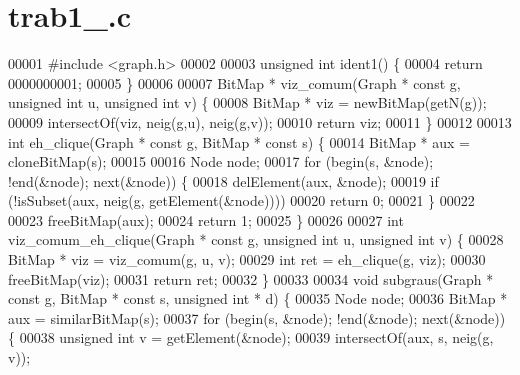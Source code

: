 \section{trab1\+\_.\+c}
\label{trab1__0000000001_8c_source}

\begin{DoxyCode}
00001 \textcolor{preprocessor}{#include <graph.h>}
00002 
00003 \textcolor{keywordtype}{unsigned} \textcolor{keywordtype}{int} ident1() \{
00004         \textcolor{keywordflow}{return} 0000000001;
00005 \}
00006 
00007 BitMap * viz_comum(Graph * \textcolor{keyword}{const} g, \textcolor{keywordtype}{unsigned} \textcolor{keywordtype}{int} u, \textcolor{keywordtype}{unsigned} \textcolor{keywordtype}{int} v) \{
00008         BitMap * viz = newBitMap(getN(g));
00009         intersectOf(viz, neig(g,u), neig(g,v));
00010         \textcolor{keywordflow}{return} viz;
00011 \}
00012 
00013 \textcolor{keywordtype}{int} eh_clique(Graph * \textcolor{keyword}{const} g, BitMap * \textcolor{keyword}{const} s) \{
00014         BitMap * aux = cloneBitMap(s);
00015 
00016         Node node;
00017         \textcolor{keywordflow}{for} (begin(s, &node); !end(&node); next(&node)) \{
00018                 delElement(aux, &node);
00019                 \textcolor{keywordflow}{if} (!isSubset(aux, neig(g, getElement(&node))))
00020                         \textcolor{keywordflow}{return} 0;
00021         \}
00022 
00023         freeBitMap(aux);
00024         \textcolor{keywordflow}{return} 1;
00025 \}
00026 
00027 \textcolor{keywordtype}{int} viz_comum_eh_clique(Graph * \textcolor{keyword}{const} g, \textcolor{keywordtype}{unsigned} \textcolor{keywordtype}{int} u, \textcolor{keywordtype}{unsigned} \textcolor{keywordtype}{int} v) \{
00028         BitMap * viz = viz_comum(g, u, v);
00029         \textcolor{keywordtype}{int} ret = eh_clique(g, viz);
00030         freeBitMap(viz);
00031         \textcolor{keywordflow}{return} ret;
00032 \}
00033 
00034 \textcolor{keywordtype}{void} subgraus(Graph * \textcolor{keyword}{const} g, BitMap * \textcolor{keyword}{const} s, \textcolor{keywordtype}{unsigned} \textcolor{keywordtype}{int} * d) \{
00035         Node node;
00036         BitMap * aux = similarBitMap(s);
00037         \textcolor{keywordflow}{for} (begin(s, &node); !end(&node); next(&node)) \{
00038                 \textcolor{keywordtype}{unsigned} \textcolor{keywordtype}{int} v = getElement(&node);
00039                 intersectOf(aux, s, neig(g, v));

\end{DoxyCode}
